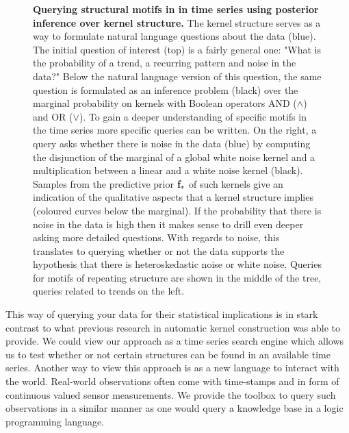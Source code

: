 \begin{figure}
\centering

\caption{{\bf Querying structural motifs in in time series using posterior inference
over kernel structure.} The kernel structure serves as a way to formulate
natural language questions about the data (blue). The initial question of interest
(top) is a fairly
general one: "What is the probability of a trend, a recurring
pattern and noise in the data?" Below the natural language version of this
question, the same question is formulated as an inference problem (black) over the
marginal probability on kernels with Boolean operators AND ($\land$) and OR ($\lor$). 
To gain  a deeper understanding of specific motifs in the time series more specific queries can
be written.
On the right, a query asks whether there is noise in the data (blue) by computing the disjunction of the marginal
of a global white noise kernel and a multiplication between a linear and a white
noise kernel (black). Samples from the predictive prior $\mathbf{f}_*$ of such kernels give an
indication of the qualitative aspects that a kernel structure implies (coloured curves below
the marginal). 
If the probability that there is noise in the data is high then it makes sense
to drill even deeper asking more detailed questions. With regards to noise, this
translates to querying whether or not the data supports the hypothesis that there is
heteroskedastic noise or white noise. Queries for motifs of repeating structure
are shown in the middle of the tree, queries related to trends on the left.}\label{fig:query}
\end{figure}
This way of querying your data for their statistical implications is in stark contrast to what previous research in automatic kernel construction was able to provide.
We could view our approach as a time series search engine which allows us to test whether or not certain structures can be found
in an available time series.
Another way to view this approach is as a new language to interact with the world.
Real-world observations often come with time-stamps and in form
of continuous valued sensor measurements.  
We provide the toolbox to query such observations in a similar manner as
one would query a knowledge base in a logic programming language.






